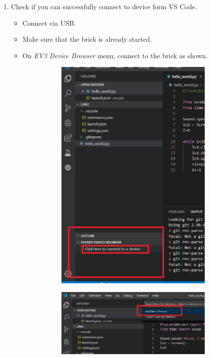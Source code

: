 \documentclass{scrartcl}
\begin{document}
\begin{enumerate}
    \item Check if you can successfully connect to device form VS Code.
        \begin{itemize}
            \item Connect via USB.
            \item Make sure that the brick is already started.
            \item On \textit{EV3 Device Browser} menu, connect to the brick as shown.
                \begin{figure}
                    \centering
                    \begin{subfigure}{.5\textwidth}
                      \centering
                      \includegraphics[width=.5\linewidth]{1.jpg}
                    \end{subfigure}%
                    \begin{subfigure}{.5\textwidth}
                      \centering
                      \includegraphics[width=.85\linewidth]{2.jpg}
                    \end{subfigure}
                    \label{fig:test}
                \end{figure}
        \end{itemize}


\end{enumerate}
\end{document}

